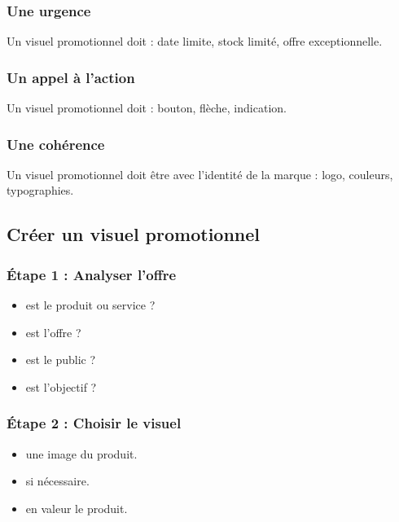 \subsubsection{Une urgence}

Un visuel promotionnel doit  : date limite, stock limité, offre exceptionnelle.

\subsubsection{Un appel à l'action}

Un visuel promotionnel doit  : bouton, flèche, indication.

\subsubsection{Une cohérence}

Un visuel promotionnel doit être  avec l'identité de la marque : logo, couleurs, typographies.

\subsection{Créer un visuel promotionnel}

\subsubsection{Étape 1 : Analyser l'offre}

\begin{itemize}
    \item {} est le produit ou service ?
    \item {} est l'offre ?
    \item {} est le public ?
    \item {} est l'objectif ?
\end{itemize}

\subsubsection{Étape 2 : Choisir le visuel}

\begin{itemize}
    \item {} une image du produit.
    \item {} si nécessaire.
    \item {} en valeur le produit.
\end{itemize}

